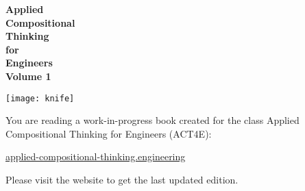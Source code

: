 
\begin{center}

  \vspace{3cm}
  {\huge\bfseries Applied\\Compositional\\Thinking \\[3mm]for\\[1mm] Engineers\\[1cm]Volume 1}


\end{center}

\vspace{3cm}
\begin{center}
  \texttt{[image: knife]}
\end{center}


\vfill

You are reading a work-in-progress book created for the
class Applied Compositional Thinking for Engineers (ACT4E):

\href{https://applied-compositional-thinking.engineering}{applied-compositional-thinking.engineering}

Please visit the website to get the last updated edition.

